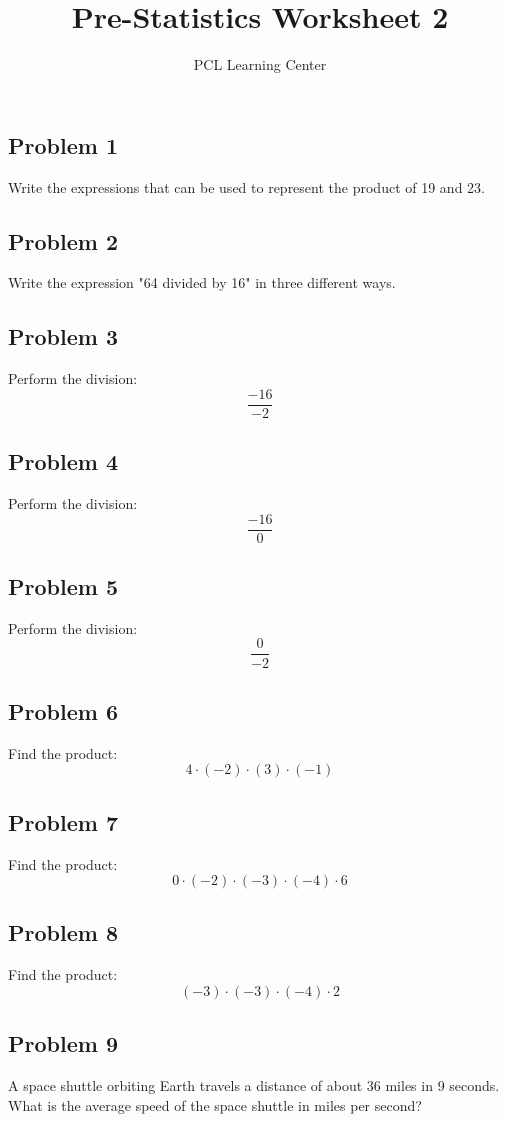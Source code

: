 \documentclass[12pt]{article}
\title{Pre-Statistics Worksheet 2}
\author{PCL Learning Center}
\date{}
\begin{document}
\maketitle

\subsection*{Problem 1}
Write the expressions that can be used to represent the product of 19 and 23.

\subsection*{Problem 2}
Write the expression "64 divided by 16" in three different ways.

\subsection*{Problem 3}
Perform the division:  
\[
\frac{-16}{-2}
\]

\subsection*{Problem 4}
Perform the division:  
\[
\frac{-16}{0}
\]

\subsection*{Problem 5}
Perform the division:  
\[
\frac{0}{-2}
\]

\subsection*{Problem 6}
Find the product:  
\[
4 \cdot (-2) \cdot (3) \cdot (-1)
\]

\subsection*{Problem 7}
Find the product:  
\[
0 \cdot (-2) \cdot (-3) \cdot (-4) \cdot 6
\]

\subsection*{Problem 8}
Find the product:  
\[
(-3) \cdot (-3) \cdot (-4) \cdot 2
\]

\subsection*{Problem 9}
A space shuttle orbiting Earth travels a distance of about 36 miles in 9 seconds.  
What is the average speed of the space shuttle in miles per second?
\end{document}
